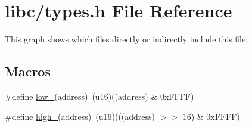 \hypertarget{a00038}{}\section{libc/types.h File Reference}
\label{a00038}
This graph shows which files directly or indirectly include this file\+:
\subsection*{Macros}
\begin{DoxyCompactItemize}
\item 
\#define \hyperlink{a00038_aded7ad58a4bedfffea10d5ae9c0c817e_aded7ad58a4bedfffea10d5ae9c0c817e}{low\+\_}(address)~(u16)((address) \& 0x\+F\+F\+F\+F)
\item 
\#define \hyperlink{a00038_a0a63db19c3e2153ed419aeccf4e33c92_a0a63db19c3e2153ed419aeccf4e33c92}{high\+\_}(address)~(u16)(((address) $>$$>$ 16) \& 0x\+F\+F\+F\+F)
\end{DoxyCompactItemize}
